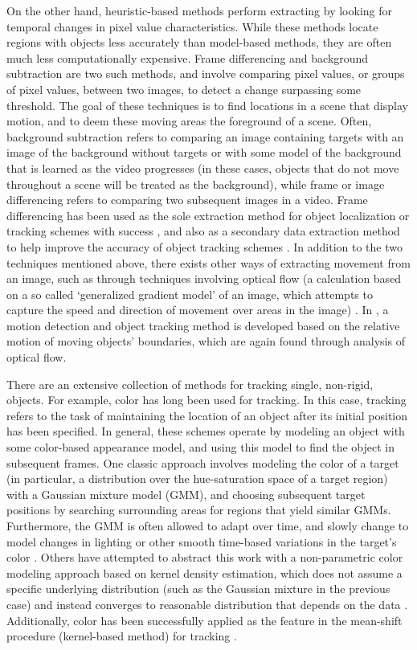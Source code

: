 \documentclass{article}
\begin{document}
On the other hand, heuristic-based methods perform extracting by looking for temporal changes in pixel value characteristics. While these methods locate regions with objects less accurately than model-based methods, they are often much less computationally expensive. Frame differencing and background subtraction are two such methods, and involve comparing pixel values, or groups of pixel values, between two images, to detect a change surpassing some threshold. The goal of these techniques is to find locations in a scene that display motion, and to deem these moving areas the foreground of a scene.  Often, background subtraction refers to comparing an image containing targets with an image of the background without targets or with some model of the background that is learned as the video progresses (in these cases, objects that do not move throughout a scene will be treated as the background), while frame or image differencing refers to comparing two subsequent images in a video. Frame differencing has been used as the sole extraction method for object localization or tracking schemes with success \citep{pece_2002, beleznai_2006, chu_2007}, and also as a secondary data extraction method to help improve the accuracy of object tracking schemes \citep{perez_2002}. In addition to the two techniques mentioned above, there exists other ways of extracting movement from an image, such as through techniques involving optical flow (a calculation based on a so called `generalized gradient model' of an image, which attempts to capture the speed and direction of movement over areas in the image) \citep{horn_1981, bobick_2001}. In \citep{black_2000}, a motion detection and object tracking method is developed based on the relative motion of moving objects' boundaries, which are again found through analysis of optical flow.

There are an extensive collection of methods for tracking single, non-rigid, objects. For example, color has long been used for tracking. In this case, tracking refers to the task of maintaining the location of an object after its initial position has been specified. In general, these schemes operate by modeling an object with some color-based appearance model, and using this model to find the object in subsequent frames. One classic approach involves modeling the color of a target (in particular, a distribution over the hue-saturation space of a target region) with a Gaussian mixture model (GMM), and choosing subsequent target positions by searching surrounding areas for regions that yield similar GMMs. Furthermore, the GMM is often allowed to adapt over time, and slowly change to model changes in lighting or other smooth time-based variations in the target's color \citep{raja_1998, mckenna_1999, jepson_2003}. Others have attempted to abstract this work with a non-parametric color modeling approach based on kernel density estimation, which does not assume a specific underlying distribution (such as the Gaussian mixture in the previous case) and instead converges to reasonable distribution that depends on the data \citep{elgammal_2001}. Additionally, color has been successfully applied as the feature in the mean-shift procedure (kernel-based method) for tracking \citep{comaniciu_2003, perez_2002, nummiaro_2003, lee_2011}.
\end{document}
